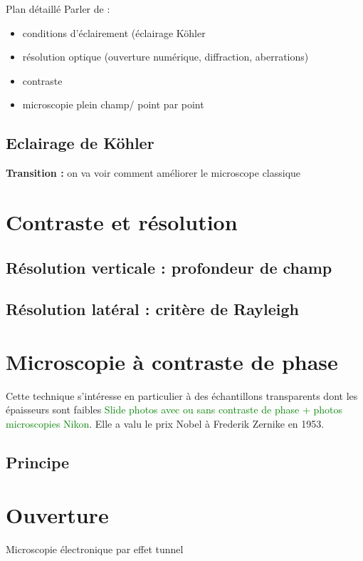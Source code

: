 \begin{reportBlock}{Plan détaillé}
  Parler de : 
  \begin{itemize}
      \item conditions d'éclairement (éclairage Köhler
      \item résolution optique (ouverture numérique, diffraction, aberrations) 
      \item contraste
      \item microscopie plein champ/ point par point
  \end{itemize}

  \subsection{Eclairage de Köhler}
  
  \textbf{Transition :} on va voir comment améliorer le microscope classique


  \section{Contraste et résolution}

  \subsection{Résolution verticale : profondeur de champ}
  
  \subsection{Résolution latéral : critère de Rayleigh}

\section{Microscopie à contraste de phase}
Cette technique s'intéresse en particulier à des échantillons transparents dont les épaisseurs sont faibles \textcolor{green}{Slide photos avec ou sans contraste de phase + photos microscopies Nikon}. Elle a valu le prix Nobel à Frederik Zernike en 1953.
\subsection{Principe}


\section*{Ouverture}
Microscopie électronique par effet tunnel

\end{reportBlock}